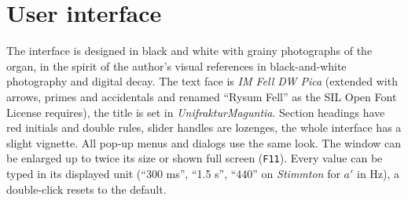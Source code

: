 \documentclass[11pt,a4paper,parskip=half,DIV=11,toc=bibliography]{scrartcl}
\newcommand{\ui}[1]{\emph{#1}}                 %
\newcommand{\code}[1]{\texttt{#1}}
\begin{document}
\section{User interface}
\label{sec:ui}

The interface is designed in black and white with grainy photographs of the organ, in the spirit of the
author's visual references in black-and-white photography and digital decay. The text face is
\emph{IM Fell DW Pica} (extended with arrows, primes and accidentals and renamed \enquote{Rysum Fell} as the
SIL Open Font License requires), the title is set in \emph{UnifrakturMaguntia}. Section headings have red
initials and double rules, slider handles are lozenges, the whole interface has a slight vignette. All
pop-up menus and dialogs use the same look. The window can be enlarged up to twice its size or shown full
screen (\code{F11}). Every value can be typed in its displayed unit (\enquote{300 ms}, \enquote{1.5 s},
\enquote{440} on \ui{Stimmton} for $a'$ in Hz), a double-click resets to the default.
\end{document}
